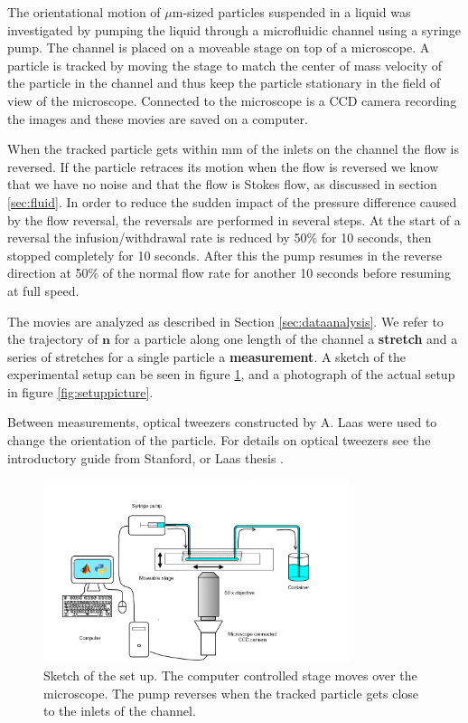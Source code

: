 \label{sec:exp_setup}
The orientational motion of $\mu$m-sized particles suspended in a liquid was investigated by pumping the liquid through a microfluidic channel using a syringe pump. The channel is placed on a moveable stage on top of a microscope. A particle is tracked by moving the stage to match the center of mass velocity of the particle in the channel and thus keep the particle stationary in the field of view of the microscope. Connected to the microscope is a CCD camera recording the images and these movies are saved on a computer. 

When the tracked particle gets within \unit[10]{mm} of the inlets on the channel the flow is reversed. If the particle retraces its motion when the flow is reversed we know that we have no noise and that the flow is Stokes flow, as discussed in section \ref{sec:fluid}. In order to reduce the sudden impact of the pressure difference caused by the flow reversal, the reversals are performed in several steps. At the start of a reversal the infusion/withdrawal rate is reduced by 50\% for 10 seconds, then stopped completely for 10 seconds. After this the pump resumes in the reverse direction at 50\% of the normal flow rate for another 10 seconds before resuming at full speed. 

The movies are analyzed as described in Section \ref{sec:dataanalysis}. We refer to the trajectory of $\mathbf{n}$ for a particle along one length of the channel a \textbf{stretch} and a series of stretches for a single particle a \textbf{measurement}. A sketch of the experimental setup can be seen in figure \ref{fig:setupsketch}, and a photograph of the actual setup in figure \ref{fig:setuppicture}. 

Between measurements, optical tweezers constructed by A. Laas were used to change the orientation of the particle. For details on optical tweezers see the introductory guide from Stanford, \cite{OpticalTweezer} or Laas thesis \cite{alexanderThesis}. 


\begin{figure}[H]
\centering
\includegraphics[width=0.8\textwidth]{figures/method/setupsketch.png}
\caption{Sketch of the set up. The computer controlled stage moves over the microscope. The pump reverses when the tracked particle gets close to the inlets of the channel.}\label{fig:setupsketch}
\end{figure}

